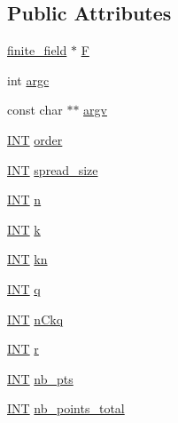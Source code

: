 \subsection*{Public Attributes}
\begin{DoxyCompactItemize}
\item 
\mbox{\hyperlink{classfinite__field}{finite\+\_\+field}} $\ast$ \mbox{\hyperlink{classtranslation__plane_ab2c1432717ccb20ff2b21ac9e47df5ea}{F}}
\item 
int \mbox{\hyperlink{classtranslation__plane_a6e0bdfa36a5bcd759183492ca85a30fa}{argc}}
\item 
const char $\ast$$\ast$ \mbox{\hyperlink{classtranslation__plane_af80b3c04fbcbf95a32c0621de19fb0ab}{argv}}
\item 
\mbox{\hyperlink{galois_8h_a09fddde158a3a20bd2dcadb609de11dc}{I\+NT}} \mbox{\hyperlink{classtranslation__plane_adb931afef4a5007998d86c0d787b1461}{order}}
\item 
\mbox{\hyperlink{galois_8h_a09fddde158a3a20bd2dcadb609de11dc}{I\+NT}} \mbox{\hyperlink{classtranslation__plane_a6405e6d53b493e05d63cadf61bb798e8}{spread\+\_\+size}}
\item 
\mbox{\hyperlink{galois_8h_a09fddde158a3a20bd2dcadb609de11dc}{I\+NT}} \mbox{\hyperlink{classtranslation__plane_a9590b758c78c73a1ea845952c1fcb41b}{n}}
\item 
\mbox{\hyperlink{galois_8h_a09fddde158a3a20bd2dcadb609de11dc}{I\+NT}} \mbox{\hyperlink{classtranslation__plane_a2344d30e5bf39474048c6f7b456578e4}{k}}
\item 
\mbox{\hyperlink{galois_8h_a09fddde158a3a20bd2dcadb609de11dc}{I\+NT}} \mbox{\hyperlink{classtranslation__plane_a1f9fd6468463c52f82485a4d3f745b6d}{kn}}
\item 
\mbox{\hyperlink{galois_8h_a09fddde158a3a20bd2dcadb609de11dc}{I\+NT}} \mbox{\hyperlink{classtranslation__plane_ac744e0a4aaa5f0ca056d5b15b1b157fd}{q}}
\item 
\mbox{\hyperlink{galois_8h_a09fddde158a3a20bd2dcadb609de11dc}{I\+NT}} \mbox{\hyperlink{classtranslation__plane_a305f86fc0b0f05bb77025209006b78e6}{n\+Ckq}}
\item 
\mbox{\hyperlink{galois_8h_a09fddde158a3a20bd2dcadb609de11dc}{I\+NT}} \mbox{\hyperlink{classtranslation__plane_a892eddb91221b4aff56fb7702dca0551}{r}}
\item 
\mbox{\hyperlink{galois_8h_a09fddde158a3a20bd2dcadb609de11dc}{I\+NT}} \mbox{\hyperlink{classtranslation__plane_af8e0818969addbc0d7c96b143e00d0b5}{nb\+\_\+pts}}
\item 
\mbox{\hyperlink{galois_8h_a09fddde158a3a20bd2dcadb609de11dc}{I\+NT}} \mbox{\hyperlink{classtranslation__plane_a5e4b6c62c8fff52ef00282ec4b217b38}{nb\+\_\+points\+\_\+total}}
$$
\end{DoxyCompactItemize}
